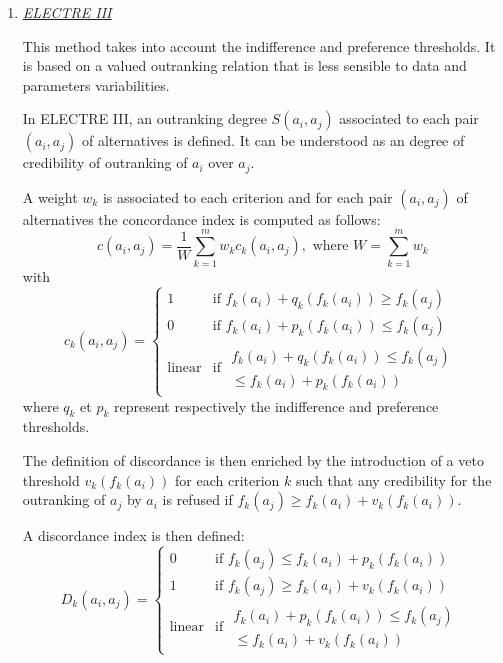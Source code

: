 \begin{enumerate}
\item \textit{\underline{ELECTRE III}}

This method takes into account the indifference and preference thresholds. It is based on a valued outranking relation that is less sensible to data and parameters variabilities.%

In ELECTRE III, an outranking degree $S(a_i, a_j)$ associated to each pair $(a_i, a_j)$ of alternatives is defined. It can be understood as an \og degree of credibility of outranking \fg of $a_i$ over $a_j$.

A weight $w_{k}$ is associated to each criterion and for each pair $(a_i, a_j)$ of alternatives the concordance index is computed as follows:
\begin{equation}
c(a_i, a_j) = \frac{1}{W} \sum_{k=1}^{m} w_{k} c_{k}(a_i, a_j), \text{ where } W = \sum_{k=1}^{m} w_{k}
\end{equation}
with
\begin{equation}
c_{k}(a_i,a_j) = \begin{cases}
	1& \text{if } f_{k}(a_i)+q_{k}(f_{k}(a_i)) \geq f_{k}(a_j)\\
	0& \text{if } f_{k}(a_i)+p_{k}(f_{k}(a_i)) \leq f_{k}(a_j)\\
	\text{linear}& \text{if } \begin{array}{rr} f_{k}(a_i)+q_{k}(f_{k}(a_i)) \leq f_{k}(a_j)\\
	\leq f_{k}(a_i)+p_{k}(f_{k}(a_i)) \end{array}
	\end{cases}
\end{equation}
where $q_{k}$ et $p_{k}$ represent respectively the indifference and preference thresholds.

The definition of discordance is then enriched by the introduction of a veto threshold $v_k(f_k(a_i))$ for each criterion $k$ such that any credibility for the outranking of $a_j$ by $a_i$ is refused if $f_k(a_j) \geq f_k(a_i) + v_k(f_k(a_i))$.

A discordance index is then defined:
\begin{equation}
D_k(a_i, a_j) = \begin{cases}
	0 & \text{if } f_k(a_j) \leq f_k(a_i) + p_k(f_k(a_i))\\
	1 & \text{if } f_k(a_j) \geq f_k(a_i) + v_k(f_k(a_i))\\
	\text{linear} & \text{if } \begin{array}{rr} f_k(a_i) + p_k(f_k(a_i)) \leq f_k(a_j)\\
	\leq f_k(a_i) + v_k(f_k(a_i)) \end{array}
	\end{cases}
\end{equation}


\end{enumerate}
